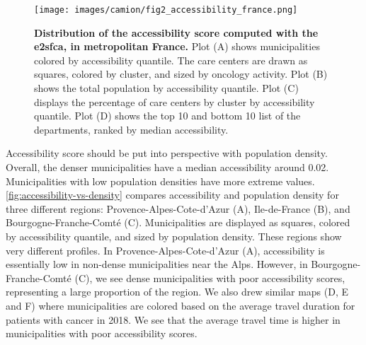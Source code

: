 \begin{figure}[H]
    \texttt{[image: images/camion/fig2\_accessibility\_france.png]}
    \centering
    \caption{ \textbf{Distribution of the accessibility score computed with the
            \ac{e2sfca}, in metropolitan France.} Plot (A) shows municipalities
        colored by accessibility quantile. The care centers are drawn as
        squares, colored by cluster, and sized by oncology activity. Plot (B)
        shows the total population by accessibility quantile. Plot (C) displays
        the percentage of care centers by cluster by accessibility quantile.
        Plot (D) shows the top 10 and bottom 10 list of the departments, ranked
        by median accessibility. }
    \label{fig:accessibility-france}
\end{figure}

Accessibility score should be put into perspective with population density.
Overall, the denser municipalities have a median accessibility around 0.02.
Municipalities with low population densities have more extreme values.
\cref{fig:accessibility-vs-density} compares accessibility and population
density for three different regions: Provence-Alpes-Cote-d'Azur (A),
Ile-de-France (B), and Bourgogne-Franche-Comté (C). Municipalities are displayed
as squares, colored by accessibility quantile, and sized by population density.
These regions show very different profiles. In Provence-Alpes-Cote-d'Azur (A),
accessibility is essentially low in non-dense municipalities near the Alps.
However, in Bourgogne-Franche-Comté (C), we see dense municipalities with poor
accessibility scores, representing a large proportion of the region. We also
drew similar maps (D, E and F) where municipalities are colored based on the
average travel duration for patients with cancer in 2018. We see that the
average travel time is higher in municipalities with poor accessibility scores.

